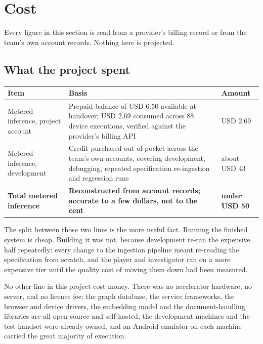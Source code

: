 \section{Cost}
\label{sec:economics}

Every figure in this section is read from a provider's billing record or from
the team's own account records. Nothing here is projected.

\subsection{What the project spent}

\begin{table}[H]
  \centering\small
  \begin{tabularx}{\textwidth}{@{}>{\hsize}Y>{\hsize}Y>{\hsize}Y@{}}
    \toprule
    Item & Basis & Amount \\
    \midrule
    Metered inference, project account & Prepaid balance of USD 6.50 available at handover; USD 2.69 consumed across 88 device executions, verified against the provider's billing API & USD 2.69 \\
    \addlinespace
    Metered inference, development & Credit purchased out of pocket across the team's own accounts, covering development, debugging, repeated specification re-ingestion and regression runs & about USD 43 \\
    \addlinespace
    \textbf{Total metered inference} & \textbf{Reconstructed from account records; accurate to a few dollars, not to the cent} & \textbf{under USD 50} \\
    \bottomrule
  \end{tabularx}
\end{table}

The split between those two lines is the more useful fact. Running the finished
system is cheap. Building it was not, because development re-ran the expensive
half repeatedly: every change to the ingestion pipeline meant re-reading the
specification from scratch, and the player and investigator ran on a more
expensive tier until the quality cost of moving them down had been measured.

No other line in this project cost money. There was no accelerator hardware, no
server, and no licence fee: the graph database, the service frameworks, the
browser and device drivers, the embedding model and the document-handling
libraries are all open-source and self-hosted, the development machines and the
test handset were already owned, and an Android emulator on each machine
carried the great majority of execution.

